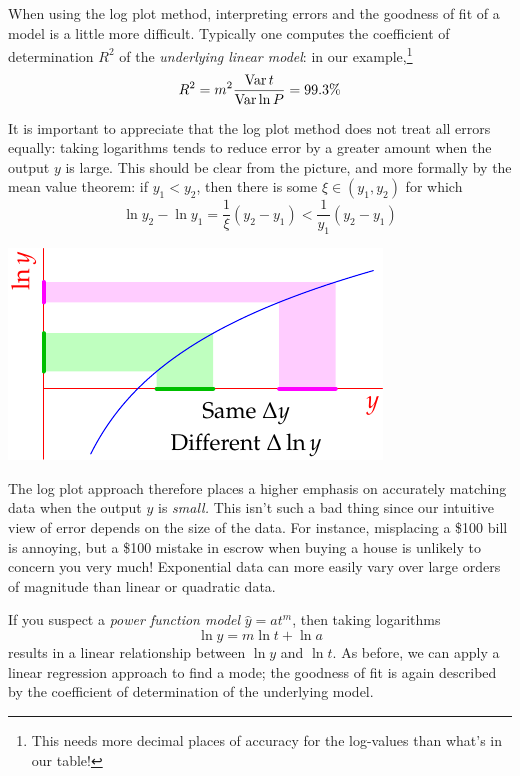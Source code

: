 When using the log plot method, interpreting errors and the goodness of fit of a model is a little more difficult. Typically one computes the coefficient of determination $R^2$ of the \emph{underlying linear model}: in our example,\footnote{This needs more decimal places of accuracy for the log-values than what's in our table!}
\[
	R^2=m^2\frac{\operatorname{Var} t}{\operatorname{Var}\ln P}=99.3\%
\]
\begin{minipage}[t]{0.6\linewidth}\vspace{0pt}
	It is important to appreciate that the log plot method does not treat all errors equally: taking logarithms tends to reduce error by a greater amount when the output  $y$ is large. This should be clear from the picture, and more formally by the mean value theorem: if $y_1<y_2$, then there is some $\xi\in(y_1,y_2)$ for which 
	\[
		\ln y_2-\ln y_1=\frac 1{\xi}(y_2-y_1)<\frac 1{y_1}(y_2-y_1)
	\]
\end{minipage}
\hfill
\begin{minipage}[t]{0.39\linewidth}\vspace{0pt}
	\flushright\includegraphics{logerror}
\end{minipage}
\medbreak

The log plot approach therefore places a higher emphasis on accurately matching data when the output $y$ is \emph{small.} This isn't such a bad thing since our intuitive view of error depends on the size of the data. For instance, misplacing a \$100 bill is annoying, but a \$100 mistake in escrow when buying a house is unlikely to concern you very much! Exponential data can more easily vary over large orders of magnitude than linear or quadratic data. 

\goodbreak


If you suspect a \emph{power function model} $\hat y=at^m$, then taking logarithms
\[
	\ln\hat y=m\ln t+\ln a
\]
results in a linear relationship between $\ln y$ and $\ln t$. As before, we can apply a linear regression approach to find a mode; the goodness of fit is again described by the coefficient of determination of the underlying model. 


